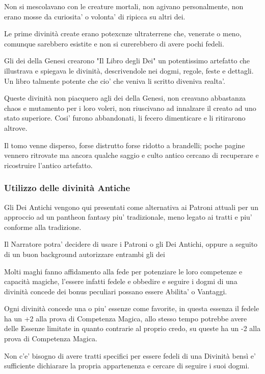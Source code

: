 \documentclass[a4paper,11pt,twoside,openany]{book}
\begin{document}
Non si mescolavano con le creature mortali, non agivano personalmente, non erano mosse da curiosita' o volonta' di ripicca su altri dei.

Le prime divinità create erano potexcnze ultraterrene che, venerate o meno, comunque sarebbero esistite e non si curerebbero di avere pochi fedeli.

Gli dei della Genesi crearono "Il Libro degli Dei" un potentissimo artefatto che illustrava e spiegava le divinità, descrivendole nei dogmi, regole, feste e dettagli.
Un libro talmente potente che cio' che veniva li scritto diveniva realta'.

Queste divinità non piacquero agli dei della Genesi, non creavano abbastanza chaos e mutamento per i loro voleri, non riuscivano ad innalzare il creato ad uno stato superiore.
Cosi' furono abbandonati, li fecero dimenticare e li ritirarono altrove.

Il tomo venne disperso, forse distrutto forse ridotto a brandelli; poche pagine vennero ritrovate ma ancora qualche saggio e culto antico cercano di recuperare e ricostruire l'antico artefatto.

\subsubsection{Utilizzo delle divinità Antiche}

Gli Dei Antichi vengono qui presentati come alternativa ai Patroni attuali per un approccio ad un pantheon  fantasy piu' tradizionale, meno legato ai tratti e piu' conforme alla tradizione.

Il Narratore potra' decidere di usare i Patroni o gli Dei Antichi, oppure a seguito di un buon background autorizzare entrambi gli dei

Molti maghi fanno affidamento alla fede per potenziare le loro competenze e capacità magiche, l'essere infatti fedele e obbedire e seguire i dogmi di una divinità concede dei bonus peculiari possano essere Abilita' o Vantaggi.

Ogni divinità concede una o piu' essenze come favorite, in questa essenza il fedele ha un +2 alla prova di Competenza Magica, allo stesso tempo potrebbe avere delle Essenze limitate in quanto contrarie al proprio credo, su queste ha un -2 alla prova di Competenza Magica.


Non c'e' bisogno di avere tratti specifici per essere fedeli di una Divinità bensì e' sufficiente dichiarare la propria appartenenza e cercare di seguire i suoi dogmi.
\end{document}
